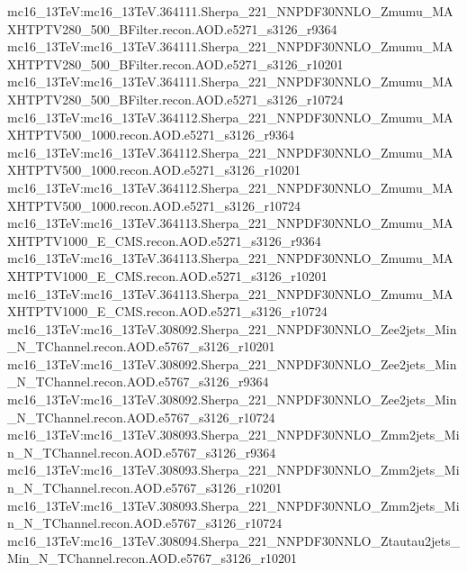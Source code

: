 { mc16\_13TeV:mc16\_13TeV.364111.Sherpa\_221\_NNPDF30NNLO\_Zmumu\_MAXHTPTV280\_500\_BFilter.recon.AOD.e5271\_s3126\_r9364 \newline    
 mc16\_13TeV:mc16\_13TeV.364111.Sherpa\_221\_NNPDF30NNLO\_Zmumu\_MAXHTPTV280\_500\_BFilter.recon.AOD.e5271\_s3126\_r10201 \newline    
 mc16\_13TeV:mc16\_13TeV.364111.Sherpa\_221\_NNPDF30NNLO\_Zmumu\_MAXHTPTV280\_500\_BFilter.recon.AOD.e5271\_s3126\_r10724 \newline    
 mc16\_13TeV:mc16\_13TeV.364112.Sherpa\_221\_NNPDF30NNLO\_Zmumu\_MAXHTPTV500\_1000.recon.AOD.e5271\_s3126\_r9364\newline     
 mc16\_13TeV:mc16\_13TeV.364112.Sherpa\_221\_NNPDF30NNLO\_Zmumu\_MAXHTPTV500\_1000.recon.AOD.e5271\_s3126\_r10201 \newline   
 mc16\_13TeV:mc16\_13TeV.364112.Sherpa\_221\_NNPDF30NNLO\_Zmumu\_MAXHTPTV500\_1000.recon.AOD.e5271\_s3126\_r10724 \newline    
 mc16\_13TeV:mc16\_13TeV.364113.Sherpa\_221\_NNPDF30NNLO\_Zmumu\_MAXHTPTV1000\_E\_CMS.recon.AOD.e5271\_s3126\_r9364 \newline    
 mc16\_13TeV:mc16\_13TeV.364113.Sherpa\_221\_NNPDF30NNLO\_Zmumu\_MAXHTPTV1000\_E\_CMS.recon.AOD.e5271\_s3126\_r10201 \newline    
 mc16\_13TeV:mc16\_13TeV.364113.Sherpa\_221\_NNPDF30NNLO\_Zmumu\_MAXHTPTV1000\_E\_CMS.recon.AOD.e5271\_s3126\_r10724 \newline    
 mc16\_13TeV:mc16\_13TeV.308092.Sherpa\_221\_NNPDF30NNLO\_Zee2jets\_Min\_N\_TChannel.recon.AOD.e5767\_s3126\_r10201 \newline    
 mc16\_13TeV:mc16\_13TeV.308092.Sherpa\_221\_NNPDF30NNLO\_Zee2jets\_Min\_N\_TChannel.recon.AOD.e5767\_s3126\_r9364 \newline    
 mc16\_13TeV:mc16\_13TeV.308092.Sherpa\_221\_NNPDF30NNLO\_Zee2jets\_Min\_N\_TChannel.recon.AOD.e5767\_s3126\_r10724 \newline    
 mc16\_13TeV:mc16\_13TeV.308093.Sherpa\_221\_NNPDF30NNLO\_Zmm2jets\_Min\_N\_TChannel.recon.AOD.e5767\_s3126\_r9364  \newline   
 mc16\_13TeV:mc16\_13TeV.308093.Sherpa\_221\_NNPDF30NNLO\_Zmm2jets\_Min\_N\_TChannel.recon.AOD.e5767\_s3126\_r10201  \newline   
 mc16\_13TeV:mc16\_13TeV.308093.Sherpa\_221\_NNPDF30NNLO\_Zmm2jets\_Min\_N\_TChannel.recon.AOD.e5767\_s3126\_r10724  \newline   
 mc16\_13TeV:mc16\_13TeV.308094.Sherpa\_221\_NNPDF30NNLO\_Ztautau2jets\_Min\_N\_TChannel.recon.AOD.e5767\_s3126\_r10201   \newline  
}
